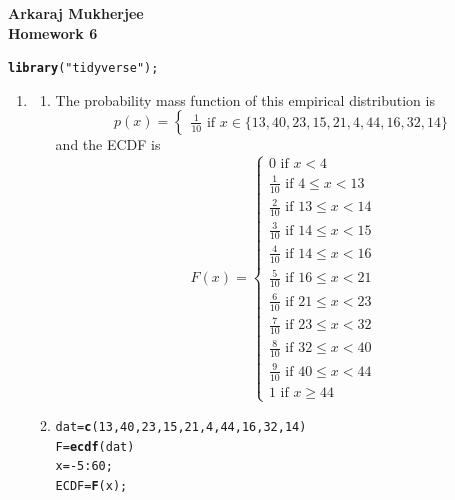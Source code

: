 \documentclass[12pt,a4paper]{article}\usepackage[]{graphicx}\usepackage[]{xcolor}
\makeatletter
\newcommand{\hlnum}[1]{\textcolor[rgb]{0.686,0.059,0.569}{#1}}%
\newcommand{\hlsng}[1]{\textcolor[rgb]{0.192,0.494,0.8}{#1}}%
\newcommand{\hlopt}[1]{\textcolor[rgb]{0,0,0}{#1}}%
\newcommand{\hldef}[1]{\textcolor[rgb]{0.345,0.345,0.345}{#1}}%
\newcommand{\hlkwb}[1]{\textcolor[rgb]{0.69,0.353,0.396}{#1}}%
\newcommand{\hlkwd}[1]{\textcolor[rgb]{0.737,0.353,0.396}{\textbf{#1}}}%
\newenvironment{kframe}{%
 \def\at@end@of@kframe{}%
 \ifinner\ifhmode%
  \def\at@end@of@kframe{\end{minipage}}%
  \begin{minipage}{\columnwidth}%
 \fi\fi%
 \def\FrameCommand##1{\hskip\@totalleftmargin \hskip-\fboxsep
 \colorbox{shadecolor}{##1}\hskip-\fboxsep
     \hskip-\linewidth \hskip-\@totalleftmargin \hskip\columnwidth}%
 \MakeFramed {\advance\hsize-\width
   \@totalleftmargin\z@ \linewidth\hsize
   \@setminipage}}%
 {\par\unskip\endMakeFramed%
 \at@end@of@kframe}
\newenvironment{knitrout}{}{} %
\makeatother
\begin{document}
{\bf Arkaraj Mukherjee} \\
{\bf Homework 6}
\\
\begin{knitrout}
\color{fgcolor}\begin{kframe}
\begin{alltt}
\hlkwd{library}\hldef{(}\hlsng{"tidyverse"}\hldef{);}
\end{alltt}
\end{kframe}
\end{knitrout}
\begin{enumerate}[label=\arabic*.]
	\item
	\begin{enumerate}[label=(\alph*)]
	\item The probability mass function of this empirical distribution is
		$$p(x) = \begin{cases}\frac{1}{10}\text{ if }x\in\{13,40,23,15,21,4,44,16,32,14\}\end{cases}$$
	and the ECDF is
	$$F(x) =
	\begin{cases}
	0\text{ if }x<4\\
	\frac{1}{10}\text{ if }4\leq x<13\\
	\frac{2}{10}\text{ if }13\leq x<14\\
	\frac{3}{10}\text{ if }14\leq x<15\\
	\frac{4}{10}\text{ if }14\leq x<16\\
	\frac{5}{10}\text{ if }16\leq x<21\\
	\frac{6}{10}\text{ if }21\leq x<23\\
	\frac{7}{10}\text{ if }23\leq x<32\\
	\frac{8}{10}\text{ if }32\leq x<40\\
	\frac{9}{10}\text{ if }40\leq x<44\\
	1\text{ if }x\geq 44
	\end{cases}$$
	\item
\begin{knitrout}
\color{fgcolor}\begin{kframe}
\begin{alltt}
\hldef{dat} \hlkwb{=} \hlkwd{c}\hldef{(}\hlnum{13}\hldef{,}\hlnum{40}\hldef{,}\hlnum{23}\hldef{,}\hlnum{15}\hldef{,}\hlnum{21}\hldef{,}\hlnum{4}\hldef{,}\hlnum{44}\hldef{,}\hlnum{16}\hldef{,}\hlnum{32}\hldef{,}\hlnum{14}\hldef{)}
\hldef{F} \hlkwb{=} \hlkwd{ecdf}\hldef{(dat)}
\hldef{x}\hlkwb{=}\hlopt{-}\hlnum{5}\hlopt{:}\hlnum{60}\hldef{;}
\hldef{ECDF}\hlkwb{=}\hlkwd{F}\hldef{(x);}

\end{alltt}
\end{kframe}
\end{knitrout}
\end{enumerate}
\end{enumerate}
\end{document}
